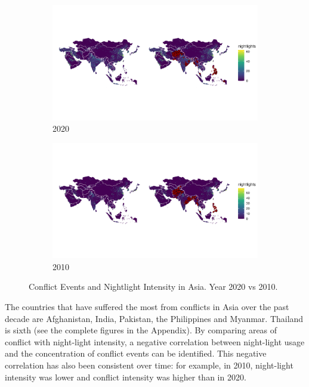 \documentclass[12pt]{article}
\begin{document}
\begin{figure}[!b]
     \centering
     \begin{subfigure}[b]{0.9\textwidth}
         \centering
         \includegraphics[width=\textwidth]{map_asian_2020.png}
         \caption{2020}
         \label{fig:asian2020}
     \end{subfigure}
    \begin{subfigure}[b]{0.9\textwidth}
         \centering
         \includegraphics[width=\textwidth]{map_asian_2010.png}
         \caption{2010}
         \label{fig:asian2010}
    \end{subfigure}
    \caption{Conflict Events and Nightlight Intensity in Asia. Year 2020 vs 2010.}
    \label{fig:asianmap}
\end{figure}

The countries that have suffered the most from conflicts in Asia over the past decade are Afghanistan, India, Pakistan, the Philippines and Myanmar. Thailand is sixth (see the complete figures in the Appendix). By comparing areas of conflict with night-light intensity, a negative correlation between night-light usage and the concentration of conflict events can be identified. This negative correlation has also been consistent over time: for example, in 2010, night-light intensity was lower and conflict intensity was higher than in 2020.
\end{document}
